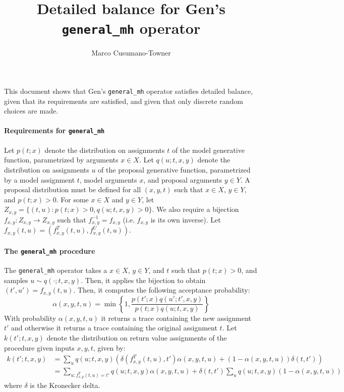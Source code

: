 \documentclass{article}
\title{Detailed balance for Gen's \texttt{general\_mh} operator}
\author{Marco Cusumano-Towner}
\begin{document}
\maketitle

This document shows that Gen's \texttt{general\_mh} operator satisfies detailed balance, given that its requirements are satisfied, and given that only discrete random choices are made.

\paragraph{Requirements for \texttt{general\_mh}}
Let $p(t; x)$ denote the distribution on assignments $t$ of the model generative function, parametrized by arguments $x \in X$.
Let $q(u; t, x, y)$ denote the distribution on assignments $u$ of the proposal generative function, parametrized by a model assignment $t$, model arguments $x$, and proposal arguments $y \in Y$.
A proposal distribution must be defined for all $(x, y, t)$ such that $x \in X$, $y \in Y$, and $p(t; x) > 0$.
For some $x \in X$ and $y \in Y$, let $Z_{x,y} = \{(t, u) : p(t; x) > 0, q(u; t, x, y) > 0\}$.
We also require a bijection $f_{x,y} : Z_{x,y} \to Z_{x,y}$ such that $f^{-1}_{x,y} = f_{x,y}$ (i.e. $f_{x,y}$ is its own inverse).
Let $f_{x,y}(t, u) = (f^T_{x,y}(t, u), f^U_{x,y}(t, u))$.

\paragraph{The \texttt{general\_mh} procedure}
The \texttt{general\_mh} operator takes a $x \in X$, $y \in Y$, and $t$ such that $p(t; x) > 0$, and samples $u \sim q(\cdot; t, x, y)$.
Then, it applies the bijection to obtain $(t', u') = f_{x,y}(t, u)$.
Then, it computes the following acceptance probability:
\[
\alpha(x, y, t, u) = \min\left\{ 1, \frac{p(t'; x) q(u'; t', x, y)}{p(t; x) q(u; t, x, y)} \right\}
\]
With probability $\alpha(x, y, t, u)$ it returns a trace containing the new assignment $t'$ and otherwise it returns a trace containing the original assignment $t$.
Let $k(t'; t, x, y)$ denote the distribution on return value assignments of the procedure given inputs $x, y, t$, given by:
\begin{align}
    k(t'; t, x, y)
    &= \sum_{u} q(u; t, x, y) \left( \delta(f^T_{x,y}(t, u), t') \alpha(x, y, t, u) + (1 - \alpha(x, y, t, u)) \delta(t, t') \right)\\
    &= \sum_{u : f^T_{x,y}(t, u) = t'} q(u; t, x, y) \alpha(x, y, t, u) + \delta(t, t') \sum_u q(u; t, x, y) (1 - \alpha(x, y, t, u))
\end{align}
where $\delta$ is the Kronecker delta.
\end{document}
